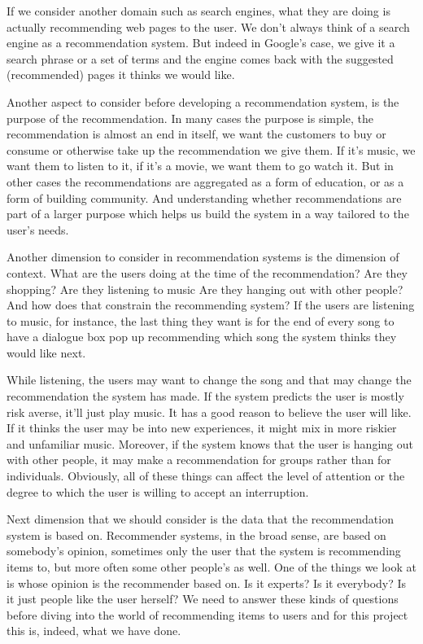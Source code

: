 \documentclass[12pt,a4paper]{report}
\begin{document}
If we consider another domain such as search engines, what they are doing is actually recommending web pages to the user. We don't always think of a search engine as a recommendation system. But indeed in Google's case, we give it a search phrase or a set of terms and the engine comes back with the suggested (recommended) pages it thinks we would like.

Another aspect to consider before developing a recommendation system, is the purpose of the recommendation. In many cases the purpose is simple, the recommendation is almost an end in itself,
we want the customers to buy or consume or otherwise
take up the recommendation we give them.
If it's music, we want them to listen to it, if it's a movie, we want them to go watch it. But in other cases the recommendations are aggregated as a form of education, or as a form of building community. And understanding whether recommendations are part of a larger purpose which helps us build the system in a way tailored to the user's needs.

Another dimension to consider in recommendation systems is the dimension of context. What are the users doing at the time of the
recommendation? Are they shopping? Are they listening to music Are they hanging out with other people? And how does that constrain the recommending system? If the users are listening to music, for instance, the last thing they want is for the end of every song to have a dialogue box pop up recommending which song the system thinks they would like next.

While listening, the users may want to change the song and that may change the recommendation the system has made. If the system predicts the user is mostly risk
averse, it'll just play music. It has a good reason to believe the user will like. If it thinks the user may be into new experiences, it might mix in more riskier and unfamiliar music. Moreover, if the system knows that the user is hanging out with other people, it may make a recommendation for groups rather than for individuals. Obviously, all of these things can affect the level of attention or the degree to which the user is willing to accept an interruption.

Next dimension that we should consider is the data that the recommendation system is based on. Recommender systems, in the broad sense, are based on somebody's opinion, sometimes only the user that the system is recommending items to, but more often some other people's as well. One of the things we look at is whose opinion is the recommender based on. Is it experts? Is it everybody? Is it just people like the user herself? We need to answer these kinds of questions before diving into the world of recommending items to users and for this project this is, indeed, what we have done.
\end{document}
